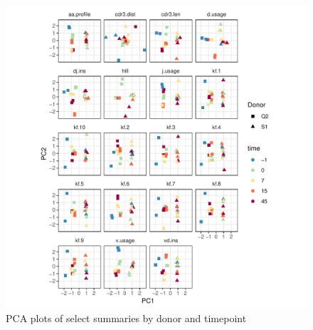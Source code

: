 \documentclass{article}
\begin{document}
\begin{figure}
    \includegraphics[width=\linewidth]{Figures/tcr_pca.pdf}
    \caption{PCA plots of select summaries by donor and timepoint}
    \label{fig:TCR_PCA}
\end{figure}
\end{document}

